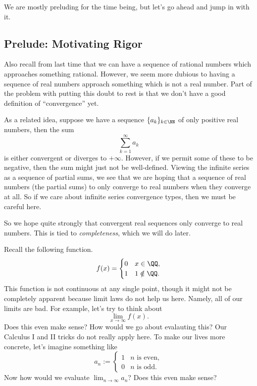 


























We are mostly preluding for the time being, but let's go ahead and jump in with it.

\subsection{Prelude: Motivating Rigor}
Also recall from last time that we can have a sequence of rational numbers which approaches something rational. However, we seem more dubious to having a sequence of real numbers approach something which is not a real number. Part of the problem with putting this doubt to rest is that we don't have a good definition of ``convergence'' yet.

As a related idea, suppose we have a sequence $\{a_k\}_{k\in\NN}$ of only positive real numbers, then the sum
\[\sum_{k=1}^\infty a_k\]
is either convergent or diverges to $+\infty.$ However, if we permit some of these to be negative, then the sum might just not be well-defined. Viewing the infinite series as a sequence of partial sums, we see that we are hoping that a sequence of real numbers (the partial sums) to only converge to real numbers when they converge at all. So if we care about infinite series convergence types, then we must be careful here.

So we hope quite strongly that convergent real sequences only converge to real numbers. This is tied to \textit{completeness}, which we will do later.

Recall the following function.
\[f(x)=\begin{cases}
	0 & x\in\QQ, \\
	1 & 1\notin\QQ.
\end{cases}\]
This function is not continuous at any single point, though it might not be completely apparent because limit laws do not help us here. Namely, all of our limits are bad. For example, let's try to think about
\[\lim_{x\to\infty}f(x).\]
Does this even make sense? How would we go about evalauting this? Our Calculus I and II tricks do not really apply here. To make our lives more concrete, let's imagine something like
\[a_n:=\begin{cases}
	1 & n\text{ is even}, \\
	0 & n\text{ is odd}.
\end{cases}\]
Now how would we evaluate $\lim_{n\to\infty}a_n$? Does this even make sense?

